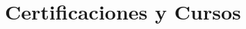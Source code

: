 \documentclass[letterpaper,12pt]{fed-res}
\begin{document}


\section{Certificaciones y Cursos}

\end{document}
